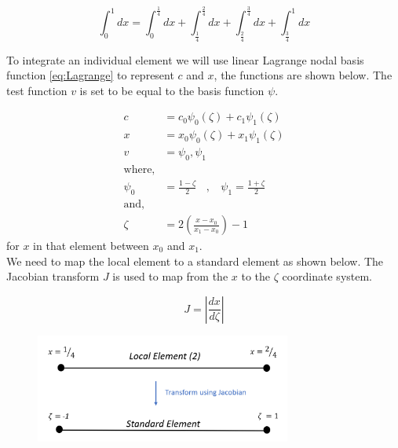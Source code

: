 \documentclass[11pt]{article}
\begin{document}
\begin{equation}
\int_0^1 dx = \int_0^\frac{1}{4}  dx + \int_\frac{1}{4}^\frac{2}{4}  dx + \int_\frac{2}{4}^\frac{3}{4}  dx + \int_\frac{3}{4}^1  dx
\end{equation}

To integrate an individual element we will use linear Lagrange nodal basis function \ref{eq:Lagrange} to represent $c$ and $x$, the functions are shown below. The test function $v$ is set to be equal to the basis function $\psi$.

\begin{subequations}
\label{eq:Lagrange}
\begin{align}
c &= c_{0}\psi_{0}(\zeta) + c_1\psi_{1}(\zeta) \label{eq:LagrangeC} \\
x &= x_{0}\psi_{0}(\zeta) + x_1\psi_{1}(\zeta) \label{eq:LagrangeX} \\
v & = \psi_{0} , \psi_{1} \label{eq:LagrangeV} \\
\text{where,}\\
\psi_{0} &= \frac{1 - \zeta}{2} \ \ \ \ ,  \ \ \ \ \psi_{1} = \frac{1 + \zeta}{2} \label{eq:LagrangePSI}\\
\text{and,}\\
\zeta  & = 2 \left(\frac{x - x_0}{x_1 - x_0}\right) - 1 \label{eq:LagrangeZeta}
\end{align}
\end{subequations}
for $x$ in that element between $x_0$ and $x_1$.\\
We need to map the local element to a standard element as shown below. The Jacobian transform $J$ is used to map from the $x$ to the $\zeta$ coordinate system.

\begin{equation} \label{eq:Jacobian}
J = \left \vert \frac{dx}{d\zeta}\right \vert
\end{equation}



\begin{figure}[h!]
\centering
\includegraphics[width=0.75\textwidth]{Local2Standard.PNG}
\end{figure}
\end{document}
